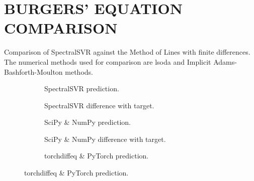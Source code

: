 \chapter{BURGERS' EQUATION COMPARISON}\label{sec:burgers_comparison}
Comparison of SpectralSVR against the Method of Lines with finite differences. The numerical methods used for comparison are lsoda and Implicit Adams-Bashforth-Moulton methods.
\begin{figure}[H]
  \centering
  \begin{adjustwidth}{-0.05\linewidth}{-0.05\linewidth}
    \begin{subfigure}{0.49\linewidth}
      \begin{adjustbox}{width=\linewidth}
        
      \end{adjustbox}
      \caption{SpectralSVR prediction.}\label{fig:comp_model_pred_0.0}
    \end{subfigure}
    \begin{subfigure}{0.49\linewidth}
      \begin{adjustbox}{width=\linewidth}
        
      \end{adjustbox}
      \caption{SpectralSVR difference with target.}\label{fig:comp_model_diff_0.0}
    \end{subfigure}
    \begin{subfigure}{0.49\linewidth}
      \begin{adjustbox}{width=\linewidth}
        
      \end{adjustbox}
      \caption{SciPy \& NumPy prediction.}\label{fig:comp_spo_pred_0.0}
    \end{subfigure}
    \begin{subfigure}{0.49\linewidth}
      \begin{adjustbox}{width=\linewidth}
        
      \end{adjustbox}
      \caption{SciPy \& NumPy difference with target.}\label{fig:comp_spo_diff_0.0}
    \end{subfigure}
    \begin{subfigure}{0.49\linewidth}
      \begin{adjustbox}{width=\linewidth}
        
      \end{adjustbox}
      \caption{torchdiffeq \& PyTorch prediction.}\label{fig:comp_tdo_pred_0.0}

\end{subfigure}
\end{adjustwidth}
\end{figure}

